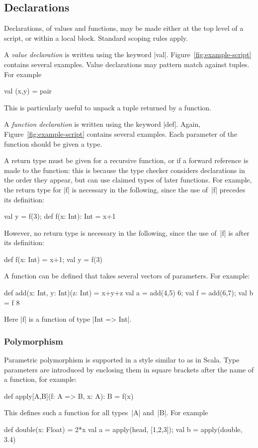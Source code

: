\subsection{Declarations}
\label{ssec:declarations}

Declarations, of values and functions, may be made either at the top level of
a script, or within a local block.  Standard scoping rules apply. 

A \emph{value declaration} is written using the keyword |val|.
Figure~\ref{fig:example-script} contains several examples.  Value declarations
may pattern match against tuples.  For example
%
\begin{scala}
val (x,y) = pair
\end{scala}
%
This is particularly useful to unpack a tuple returned by a function. 

A \emph{function declaration} is written using the keyword |def|.  Again,
Figure~\ref{fig:example-script} contains several examples.  Each parameter of
the function should be given a type.  

A return type must be given for a recursive function, or if a forward
reference is made to the function: this is because the type checker considers
declarations in the order they appear, but can use claimed types of later
functions.  For example, the return type for |f| is necessary in the
following, since the use of~|f| precedes its definition:
%
\begin{scala}
val y = f(3); def f(x: Int): Int = x+1
\end{scala}
%
However, no return type is necessary in the following, since the use of~|f| is
after its definition:
%
\begin{scala}
def f(x: Int) = x+1; val y = f(3) 
\end{scala}

A function can be defined that takes several vectors of parameters.  For
example: 
%
\begin{scala}
def add(x: Int, y: Int)(z: Int) = x+y+z
val a = add(4,5) 6; val f = add(6,7); val b = f 8
\end{scala}
%
Here |f| is a function of type |Int => Int|.


\subsubsection{Polymorphism}

Parametric polymorphism is supported in a style similar to as in Scala.  Type
parameters are introduced by enclosing them in square brackets after the name
of a function, for example:
%
\begin{scala}
def apply[A,B](f: A => B, x: A): B = f(x)
\end{scala}
%
This defines such a function for all types~|A| and~|B|.  For example
\begin{scala}
def double(x: Float) = 2*x
val a = apply(head, [1,2,3]); val b = apply(double, 3.4)
\end{scala}

